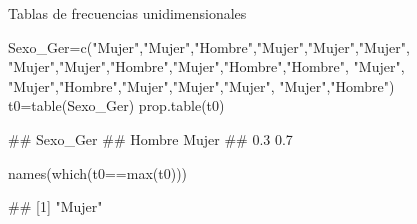 \documentclass[
  ignorenonframetext,
  aspectratio=169]{beamer}
\newenvironment{Shaded}{\begin{snugshade}}{\end{snugshade}}
\newcommand{\FunctionTok}[1]{\textcolor[rgb]{0.00,0.00,0.00}{#1}}
\newcommand{\NormalTok}[1]{#1}
\newcommand{\OtherTok}[1]{\textcolor[rgb]{0.56,0.35,0.01}{#1}}
\newcommand{\SpecialCharTok}[1]{\textcolor[rgb]{0.00,0.00,0.00}{#1}}
\newcommand{\StringTok}[1]{\textcolor[rgb]{0.31,0.60,0.02}{#1}}
\let\oldverbatim\verbatim
\let\endoldverbatim\endverbatim
\renewenvironment{verbatim}{\tiny\oldverbatim}{\endoldverbatim}
\begin{document}
\begin{frame}[fragile]{Tablas de frecuencias unidimensionales}
\protect\hypertarget{tablas-de-frecuencias-unidimensionales-15}{}
\begin{Shaded}
\begin{Highlighting}[]
\NormalTok{Sexo\_Ger}\OtherTok{=}\FunctionTok{c}\NormalTok{(}\StringTok{"Mujer"}\NormalTok{,}\StringTok{"Mujer"}\NormalTok{,}\StringTok{"Hombre"}\NormalTok{,}\StringTok{"Mujer"}\NormalTok{,}\StringTok{"Mujer"}\NormalTok{,}\StringTok{"Mujer"}\NormalTok{,}
           \StringTok{"Mujer"}\NormalTok{,}\StringTok{"Mujer"}\NormalTok{,}\StringTok{"Hombre"}\NormalTok{,}\StringTok{"Mujer"}\NormalTok{,}\StringTok{"Hombre"}\NormalTok{,}\StringTok{"Hombre"}\NormalTok{,}
           \StringTok{"Mujer"}\NormalTok{, }\StringTok{"Mujer"}\NormalTok{,}\StringTok{"Hombre"}\NormalTok{,}\StringTok{"Mujer"}\NormalTok{,}\StringTok{"Mujer"}\NormalTok{,}\StringTok{"Mujer"}\NormalTok{,}
           \StringTok{"Mujer"}\NormalTok{,}\StringTok{"Hombre"}\NormalTok{)}
\NormalTok{t0}\OtherTok{=}\FunctionTok{table}\NormalTok{(Sexo\_Ger)}
\FunctionTok{prop.table}\NormalTok{(t0) }
\end{Highlighting}
\end{Shaded}

\begin{verbatim}
## Sexo_Ger
## Hombre  Mujer 
##    0.3    0.7
\end{verbatim}

\begin{Shaded}
\begin{Highlighting}[]
\FunctionTok{names}\NormalTok{(}\FunctionTok{which}\NormalTok{(t0}\SpecialCharTok{==}\FunctionTok{max}\NormalTok{(t0))) }
\end{Highlighting}
\end{Shaded}

\begin{verbatim}
## [1] "Mujer"
\end{verbatim}
\end{frame}
\end{document}
